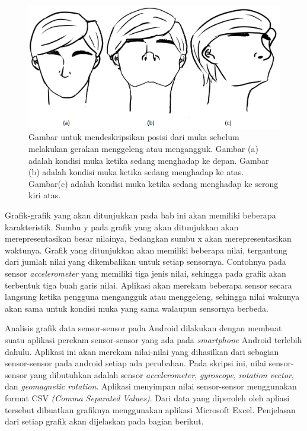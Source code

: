 \documentclass[a4paper,twoside]{article}
\begin{document}
\begin{enumerate}
\begin{figure}[htbp]
\centering
\includegraphics[scale=0.4]{Gambar/posisi-muka.png}
\caption{Gambar untuk mendeskripsikan posisi dari muka sebelum melakukan gerakan menggeleng atau mengangguk. Gambar (a) adalah kondisi muka ketika sedang menghadap ke depan. Gambar (b) adalah kondisi muka ketika sedang menghadap ke atas. Gambar(c) adalah kondisi muka ketika sedang menghadap ke serong kiri atas.}
\label{fig:posisi-muka}
\end{figure}

Grafik-grafik yang akan ditunjukkan pada bab ini akan memiliki beberapa karakteristik. Sumbu y pada grafik yang akan ditunjukkan akan merepresentasikan besar nilainya, Sedangkan sumbu x akan merepresentasikan waktunya. Grafik yang ditunjukkan akan memiliki beberapa nilai, tergantung dari jumlah nilai yang dikembalikan untuk setiap sensornya. Contohnya pada sensor \textit{accelerometer} yang memiliki tiga jenis nilai, sehingga pada grafik akan terbentuk tiga buah garis nilai. Aplikasi akan merekam beberapa sensor secara langsung ketika pengguna mengangguk atau menggeleng, sehingga nilai wakunya akan sama untuk kondisi muka yang sama walaupun sensornya berbeda.

Analisis grafik data sensor-sensor pada Android dilakukan dengan membuat suatu aplikasi perekam sensor-sensor yang ada pada \textit{smartphone} Android terlebih dahulu. Aplikasi ini akan merekam nilai-nilai yang dihasilkan dari sebagian sensor-sensor pada android setiap ada perubahan. Pada skripsi ini, nilai sensor-sensor yang dibutuhkan adalah sensor \textit{accelerometer}, \textit{gyroscope}, \textit{rotation vector}, dan \textit{geomagnetic rotation}. Aplikasi menyimpan nilai sensor-sensor menggunakan format CSV \textit{(Comma Separated Values)}. Dari data yang diperoleh oleh apliasi tersebut dibuatkan grafiknya menggunakan aplikasi Microsoft Excel. Penjelasan dari setiap grafik akan dijelaskan pada bagian berikut.\\


\end{enumerate}
\end{document}
